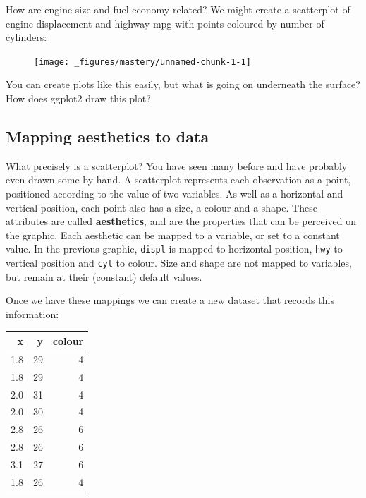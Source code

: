 How are engine size and fuel economy related? We might create a
scatterplot of engine displacement and highway mpg with points coloured
by number of cylinders:

\begin{Shaded}
\begin{Highlighting}[]
 
\StringTok{  }\NormalTok{()}
\end{Highlighting}
\end{Shaded}

\begin{figure}[H]
  \centering
  \texttt{[image: \_figures/mastery/unnamed-chunk-1-1]}
\end{figure}

You can create plots like this easily, but what is going on underneath
the surface? How does ggplot2 draw this plot?

\subsection{Mapping aesthetics to
data}\label{mapping-aesthetics-to-data}

What precisely is a scatterplot? You have seen many before and have
probably even drawn some by hand. A scatterplot represents each
observation as a point, positioned according to the value of two
variables. As well as a horizontal and vertical position, each point
also has a size, a colour and a shape. These attributes are called
\textbf{aesthetics}, and are the properties that can be perceived on the
graphic. Each aesthetic can be mapped to a variable, or set to a
constant value. In the previous graphic, \texttt{displ} is mapped to
horizontal position, \texttt{hwy} to vertical position and \texttt{cyl}
to colour. Size and shape are not mapped to variables, but remain at
their (constant) default values. 

Once we have these mappings we can create a new dataset that records
this information:

\begin{longtable}[c]{@{}rrr@{}}
\toprule
x & y & colour\tabularnewline
\midrule
\endhead
1.8 & 29 & 4\tabularnewline
1.8 & 29 & 4\tabularnewline
2.0 & 31 & 4\tabularnewline
2.0 & 30 & 4\tabularnewline
2.8 & 26 & 6\tabularnewline
2.8 & 26 & 6\tabularnewline
3.1 & 27 & 6\tabularnewline
1.8 & 26 & 4\tabularnewline
\bottomrule
\end{longtable}


